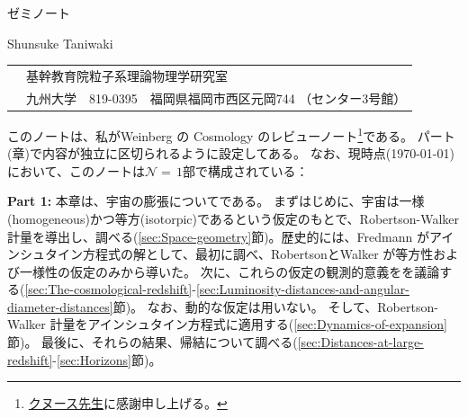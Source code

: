 \documentclass[11pt,a4paper,dvipdfmx]{jsarticle}
\theoremstyle{plain}
\theoremstyle{break}
\def\Nequals#1{$\mathcal{N}{=}\,#1$}
\begin{document}

\begin{flushright}
ゼミノート
\end{flushright}

\vskip 4cm

\begin{center}

{\Large {}}


\vskip 1cm
 Shunsuke Taniwaki
\vskip 1cm

\begin{tabular}{ll}
  & 基幹教育院粒子系理論物理学研究室\\
  & 九州大学　819-0395　福岡県福岡市西区元岡744 （センター3号館）
\end{tabular}

\vskip 1cm

\end{center}

\noindent
このノートは、私がWeinberg の Cosmology のレビューノート\footnote{\href{https://en.wikipedia.org/wiki/Donald_Knuth}{クヌース先生}に感謝申し上げる。
}である。
パート(章)で内容が独立に区切られるように設定してある。
なお、現時点(\today)において、このノートは\Nequals{1}部で構成されている：

\smallskip

\noindent\textbf{Part 1:}
本章は、宇宙の膨張についてである。
まずはじめに、宇宙は一様(homogeneous)かつ等方(isotorpic)であるという仮定のもとで、Robertson-Walker 計量を導出し、調べる(\ref{sec:Space-geometry}節)。歴史的には、Fredmann がアインシュタイン方程式の解として、最初に調べ、RobertsonとWalker が等方性および一様性の仮定のみから導いた。
次に、これらの仮定の観測的意義をを議論する(\ref{sec:The-cosmological-redshift}-\ref{sec:Luminosity-distances-and-angular-diameter-distances}節)。
なお、動的な仮定は用いない。
そして、Robertson-Walker 計量をアインシュタイン方程式に適用する(\ref{sec:Dynamics-of-expansion}節)。
最後に、それらの結果、帰結について調べる(\ref{sec:Distances-at-large-redshift}-\ref{sec:Horizons}節)。






\setcounter{tocdepth}{3}
\tableofcontents

\newpage


%
\setcounter{section}{-1}
\end{document}
